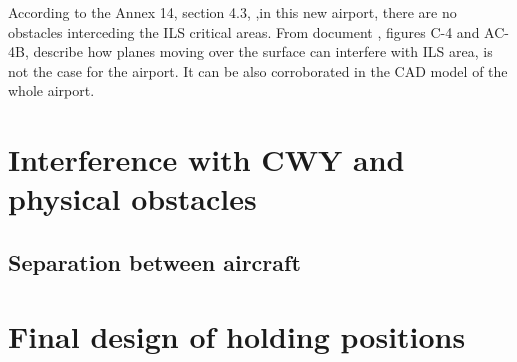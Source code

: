 	According to the Annex 14, section 4.3, \cite{Standards2016},in this new airport, there are no obstacles interceding the ILS critical areas. From document \cite{Telecomunicaciones}, figures C-4 and AC-4B, describe how planes moving over the surface can interfere with ILS area, is not the case for the airport. It can be also corroborated in the CAD model of the whole airport. 
	
	
	
	
	\section{Interference with CWY and physical obstacles}
	
	\subsection{Separation between aircraft }
	
	\section{Final design of holding positions}
